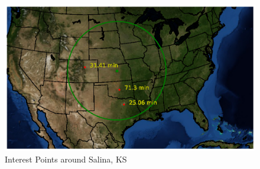 \begin{figure}
    \centering
    \includegraphics[width = 13cm]{Thesis/Method/IntPtsFigure.eps}
    \caption{Interest Points around Salina, KS}
    \label{fig:intPtsMap}
\end{figure}
